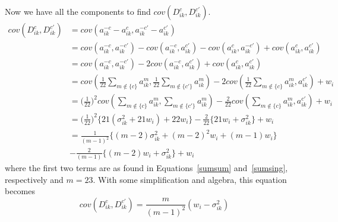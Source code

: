 \documentclass[11pt]{article} %
\begin{document}

Now we have all the components to find $cov(D_{ik}^c,D_{ik}^{c'})$.
\begin{align}
cov(D_{ik}^c,D_{ik}^{c'}) &= cov(a_{ik}^{-c}-a_{ik}^c,a_{ik}^{-c'}-a_{ik}^{c'})\\
&= cov(a_{ik}^{-c},a_{ik}^{-c'})-cov(a_{ik}^{-c},a_{ik}^{c'})-cov(a_{ik}^c,a_{ik}^{-c'})+cov(a_{ik}^c,a_{ik}^{c'})\\
&= cov(a_{ik}^{-c},a_{ik}^{-c'})-2cov(a_{ik}^{-c},a_{ik}^{c'})+cov(a_{ik}^c,a_{ik}^{c'})\\
&= cov(\frac{1}{22}\sum_{m \notin\{c\}}a_{ik}^{m}, \frac{1}{22}\sum_{m\notin \{c'\}}a_{ik}^{m})-2cov(\frac{1}{22}\sum_{m\notin \{c\}}a_{ik}^{m}, a_{ik}^{c'})+w_{i}\\
&=\Big( \frac{1}{22}\Big) ^2 cov(\sum_{m \notin\{c\}}a_{ik}^{m}, \sum_{m\notin \{c'\}}a_{ik}^{m})-\frac{2}{22}cov(\sum_{m\notin \{c\}}a_{ik}^{m}, a_{ik}^{c'})+w_{i}\\
&=\Big( \frac{1}{22}\Big) ^2\{21(\sigma^2_{ik}+21w_{i})+22w_{i}\} -\frac{2}{22}\{21w_{i}+\sigma^2_{ik}\}+w_{i}\\
&=\frac{1}{(m-1)^2}\{(m-2)\sigma^2_{ik}+(m-2)^2w_{i}+(m-1)w_{i}\} \\
&-\frac{2}{(m-1)}\{(m-2)w_{i}+\sigma^2_{ik}\}+w_{i}
\end{align}
where the first two terms are as found in Equations~\ref{sumsum} and~\ref{sumsing}, respectively and $m=23$.
With some simplification and algebra, this equation becomes 
\begin{equation}
cov(D_{ik}^c,D_{ik}^{c'})=\frac{m}{(m-1)^2}(w_{i}-\sigma^2_{ik})
\end{equation}
\end{document}
